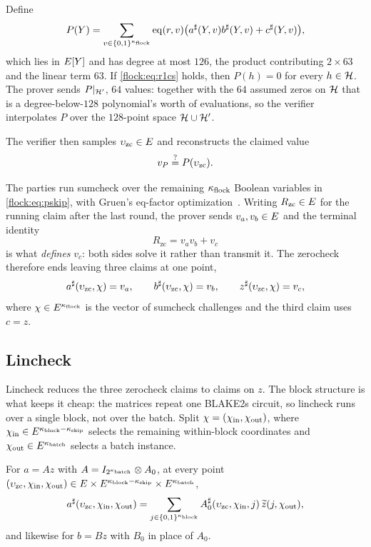 Define
\begin{equation}\label{flock:eq:pskip}
P(Y)=\sum_{v\in\{0,1\}^{\kappa_{\mathrm{flock}}}}\operatorname{eq}(r,v)\bigl(a^{\sharp}(Y,v)b^{\sharp}(Y,v)+c^{\sharp}(Y,v)\bigr),
\end{equation}
which lies in $E[Y]$ and has degree at most $126$, the product contributing $2\times 63$ and the linear term $63$. If \eqref{flock:eq:r1cs} holds, then $P(h)=0$ for every $h\in\mathcal{H}$. The prover sends $P|_{\mathcal{H}'}$, $64$ values: together with the $64$ assumed zeros on $\mathcal{H}$ that is a degree-below-$128$ polynomial's worth of evaluations, so the verifier interpolates $P$ over the $128$-point space $\mathcal{H}\cup\mathcal{H}'$.

The verifier then samples $\upsilon_{\mathrm{zc}}\in E$ and reconstructs the claimed value
\[
v_P \stackrel{?}{=} P(\upsilon_{\mathrm{zc}}).
\]

The parties run sumcheck over the remaining $\kappa_{\mathrm{flock}}$ Boolean variables in \eqref{flock:eq:pskip}, with Gruen's eq-factor optimization~\cite{Gru24}. Writing $R_{\mathrm{zc}}\in E$ for the running claim after the last round, the prover sends $v_a,v_b\in E$ and the terminal identity
\begin{equation}\label{flock:eq:zc-terminal}
R_{\mathrm{zc}}=v_av_b+v_c
\end{equation}
is what \emph{defines} $v_c$: both sides solve it rather than transmit it. The zerocheck therefore ends leaving three claims at one point,
\begin{equation}\label{flock:eq:zc-claims}
a^{\sharp}(\upsilon_{\mathrm{zc}},\chi)=v_a,\qquad b^{\sharp}(\upsilon_{\mathrm{zc}},\chi)=v_b,\qquad z^{\sharp}(\upsilon_{\mathrm{zc}},\chi)=v_c,
\end{equation}
where $\chi\in E^{\kappa_{\mathrm{flock}}}$ is the vector of sumcheck challenges and the third claim uses $c=z$.

\subsection{Lincheck}\label{flock:lincheck}

Lincheck reduces the three zerocheck claims to claims on $z$. The block structure is what keeps it cheap: the matrices repeat one BLAKE2s circuit, so lincheck runs over a single block, not over the batch. Split $\chi=(\chi_{\mathrm{in}},\chi_{\mathrm{out}})$, where $\chi_{\mathrm{in}}\in E^{\kappa_{\mathrm{block}}-\kappa_{\mathrm{skip}}}$ selects the remaining within-block coordinates and $\chi_{\mathrm{out}}\in E^{\kappa_{\mathrm{batch}}}$ selects a batch instance.

\begin{lemma}\label{lem:flock-block-diagonal}
For $a=Az$ with $A=I_{2^{\kappa_{\mathrm{batch}}}}\otimes A_0$, at every point $(\upsilon_{\mathrm{zc}},\chi_{\mathrm{in}},\chi_{\mathrm{out}})\in E\times E^{\kappa_{\mathrm{block}}-\kappa_{\mathrm{skip}}}\times E^{\kappa_{\mathrm{batch}}}$,
\[
a^{\sharp}(\upsilon_{\mathrm{zc}},\chi_{\mathrm{in}},\chi_{\mathrm{out}})=\sum_{j\in\{0,1\}^{\kappa_{\mathrm{block}}}}A^{\sharp}_0(\upsilon_{\mathrm{zc}},\chi_{\mathrm{in}},j)\,\widetilde{z}(j,\chi_{\mathrm{out}}),
\]
and likewise for $b=Bz$ with $B_0$ in place of $A_0$.
\end{lemma}

